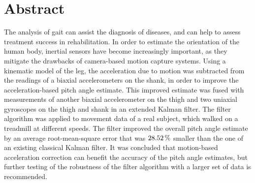 \chapter{Abstract}

The analysis of gait can assist the diagnosis of diseases, and can help to assess treatment success in rehabilitation. In order to estimate the orientation of the human body, inertial sensors have become increasingly important, as they mitigate the drawbacks of camera-based motion capture systems. Using a kinematic model of the leg, the acceleration due to motion was subtracted from the readings of a biaxial accelerometers on the shank, in order to improve the acceleration-based pitch angle estimate. This improved estimate was fused with measurements of another biaxial accelerometer on the thigh and two uniaxial gyroscopes on the thigh and shank in an extended Kalman filter. The filter algorithm was applied to movement data of a real subject, which walked on a treadmill at different speeds. The filter improved the overall pitch angle estimate by an average root-mean-square error that was $\unit[28.52]{\%}$ smaller than the one of an existing classical Kalman filter. It was concluded that motion-based acceleration correction can benefit the accuracy of the pitch angle estimates, but further testing of the robustness of the filter algorithm with a larger set of data is recommended.

